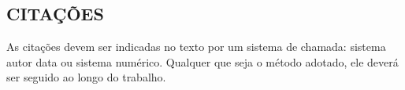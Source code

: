 \subsection{CITAÇÕES}

As citações devem ser indicadas no texto por um sistema de chamada: sistema autor data ou sistema numérico. Qualquer que seja o método adotado, ele deverá ser seguido ao longo do trabalho.

  
